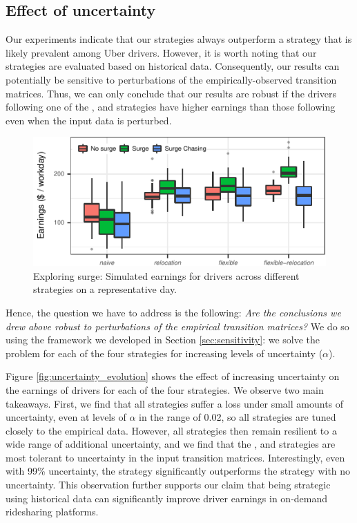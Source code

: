 \subsection{Effect of uncertainty}
\label{sec:effect_of_uncertainty} 
Our experiments indicate that our strategies always outperform a {\naive} strategy that is likely prevalent 
among Uber drivers. However, it is worth noting that our strategies are evaluated based on historical data. Consequently, 
our results can potentially be sensitive to perturbations of the empirically-observed transition matrices. 
Thus, we can only conclude that our results are robust if
the drivers following one of the {\relocation}, {\flexible} and {\relocationflexible} strategies
have higher earnings than those following {\naive} even when the input data is perturbed.
\begin{figure}
	\includegraphics{figures/simulated_earnings.pdf}
	\caption{Exploring surge: Simulated earnings for drivers across different strategies on a representative day.}
	\label{fig:simulated_earnings}
\end{figure}

Hence, the question we have to address is the following: 
\textit{Are the conclusions we drew above robust to perturbations of the empirical transition matrices?} We do so using
the framework we developed in Section \ref{sec:sensitivity}:  
we solve the {\robustproblem} problem for each of the four strategies for increasing levels of uncertainty ($\alpha$).

Figure \ref{fig:uncertainty_evolution} shows the effect of increasing uncertainty on the earnings of drivers for
    each of the four strategies.  We observe two main takeaways.  First, we find that all strategies
   suffer a loss under small amounts of uncertainty, even at levels of $\alpha$ in the range of 0.02, so all
   strategies are tuned closely to the empirical data.  
However, all strategies then remain resilient to a wide range of additional uncertainty, and we find that
   the {\relocation}, {\flexible} and {\relocationflexible} strategies are most tolerant to uncertainty 
  in the input transition matrices. 
Interestingly, even with 99\% uncertainty, the {\relocationflexible} strategy significantly outperforms 
  the {\naive} strategy with no uncertainty.
This observation further supports our claim that being strategic using historical data can significantly improve driver 
  earnings in on-demand ridesharing platforms. 

